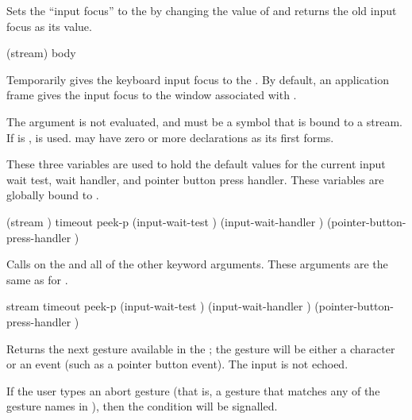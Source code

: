 Sets the ``input focus'' to the   by
changing the value of  and returns the old input
focus as its value.

 {(stream) \body body}

Temporarily gives the keyboard input focus to the 
.  By default, an application frame gives the input focus to the
window associated with .

The  argument is not evaluated, and must be a symbol that is bound
to a stream.  If  is ,  is used.
 may have zero or more declarations as its first forms.



These three variables are used to hold the default values for the current input
wait test, wait handler, and pointer button press handler.  These variables are
globally bound to .


 {\key (stream )
                            timeout peek-p
                            (input-wait-test )
                            (input-wait-handler )
                            (pointer-button-press-handler )}

Calls  on the  
and all of the other keyword arguments.  These arguments are the same as for
.

 {stream
                                   \key timeout peek-p
                                        (input-wait-test )
                                        (input-wait-handler )
                                        (pointer-button-press-handler )}

Returns the next gesture available in the 
; the gesture will be either a character or an event (such as a
pointer button event).  The input is not echoed.

If the user types an abort gesture (that is, a gesture that matches any of the
gesture names in ), then the  condition
will be signalled.

